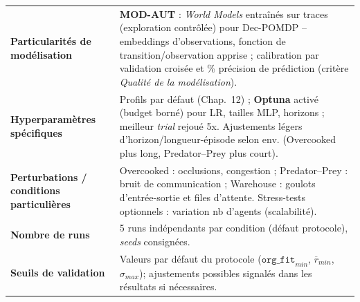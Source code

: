 \begin{table}[h!]
{\begin{tabular}{p{5cm}p{8.5cm}}
      \textbf{Particularités de modélisation}           & \textbf{MOD-AUT} : \textit{World Models} entraînés sur traces (exploration contrôlée) pour Dec-POMDP -- embeddings d’observations, fonction de transition/observation apprise ; calibration par validation croisée et \% précision de prédiction (critère \emph{Qualité de la modélisation}).                                                                                                                                                                          \\

      \textbf{Hyperparamètres spécifiques}              & Profils par défaut (Chap.~12) ; \textbf{Optuna} activé (budget borné) pour LR, tailles MLP, horizons ; meilleur \emph{trial} rejoué 5x. Ajustements légers d’horizon/longueur-épisode selon env. (Overcooked plus long, Predator–Prey plus court).                                                                                                                                                                                                                     \\

      \textbf{Perturbations / conditions particulières} & Overcooked : occlusions, congestion ; Predator–Prey : bruit de communication ; Warehouse : goulots d’entrée-sortie et files d’attente. Stress-tests optionnels : variation nb d’agents (scalabilité).                                                                                                                                                                                                                                                                  \\

      \textbf{Nombre de runs}                           & 5 runs indépendants par condition (défaut protocole), \emph{seeds} consignées.                                                                                                                                                                                                                                                                                                                                                                                         \\

      \textbf{Seuils de validation}                     & Valeurs par défaut du protocole (\(\texttt{org\_fit}_{min}\), \(\overline{r}_{min}\), \(\sigma_{max}\)); ajustements possibles signalés dans les résultats si nécessaires.                                                                                                                                                                                                                                                                                             \\
      \hline
    \end{tabular}
  }
\end{table}

